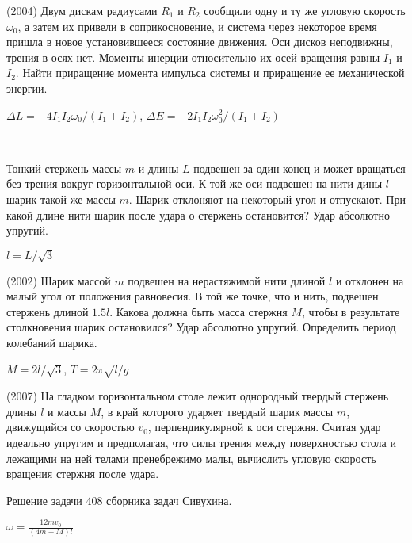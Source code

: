 \begin{ex}
(2004) Двум дискам радиусами $R_1$ и $R_2$ сообщили одну и ту же угловую скорость $\omega_0$, а затем их привели в соприкосновение, и система через некоторое время пришла в новое установившееся состояние движения. Оси дисков неподвижны, трения в осях нет. Моменты инерции относительно их осей вращения равны $I_1$ и $I_2$. Найти приращение момента импульса системы и приращение ее механической энергии.
\begin{ans}
$\Delta L = -4I_1I_2\omega_0/(I_1+I_2)$, $\Delta E = -2I_1I_2\omega_0^2/(I_1+I_2)$
\end{ans}
\end{ex}

\begin{ex}
\hspace{0pt} \\
\begin{minipage}{.65\textwidth}
Тонкий стержень массы $m$ и длины $L$ подвешен за один конец и может вращаться без трения вокруг горизонтальной оси. К той же оси подвешен на нити дины $l$ шарик такой же массы $m$. Шарик отклоняют на некоторый угол и отпускают. При какой длине нити шарик после удара о стержень остановится? Удар абсолютно упругий.
\end{minipage}
\begin{minipage}{.35\textwidth}
\centering

\end{minipage}
\begin{ans}
$l = L/\sqrt{3}$
\end{ans}
\end{ex}

\begin{ex}
(2002) Шарик массой $m$ подвешен на нерастяжимой нити длиной $l$ и отклонен на малый угол от положения равновесия. В той же точке, что и нить, подвешен стержень длиной $1.5l$. Какова должна быть масса стержня $M$, чтобы в результате столкновения шарик остановился? Удар абсолютно упругий. Определить период колебаний шарика.
\begin{ans}
$M=2l/\sqrt{3}$, $T = 2\pi \sqrt{l/g}$
\end{ans}
\end{ex}

\begin{ex}
(2007) На гладком горизонтальном столе лежит однородный твердый стержень длины $l$ и массы $M$, в край которого ударяет твердый шарик массы $m$, движущийся со скоростью $v_0$, перпендикулярной к оси стержня. Считая удар идеально упругим и предполагая, что силы трения между поверхностью стола и лежащими на ней телами пренебрежимо малы, вычислить угловую скорость вращения стержня после удара.
\begin{sol}
Решение задачи 408 сборника задач Сивухина.
\end{sol}
\begin{ans}
$\omega = \frac{12mv_0}{(4m+M)l}$
\end{ans}
\end{ex}

